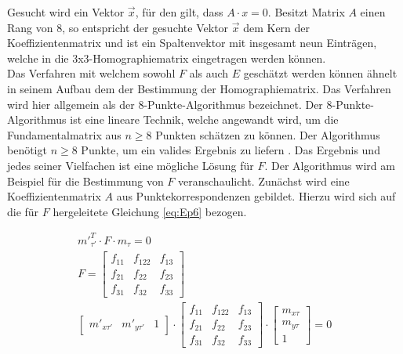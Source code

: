 Gesucht wird ein Vektor $\vec{x}$, für den gilt, dass $A \cdot x = 0$. Besitzt Matrix $A$ einen Rang von 8, so entspricht der gesuchte Vektor $\vec{x}$ dem Kern der Koeffizientenmatrix und ist ein Spaltenvektor mit insgesamt neun Einträgen, welche in die 3x3-Homographiematrix eingetragen werden können\cite{HZ,Schwarz}.\\


Das Verfahren mit welchem sowohl $F$ als auch $E$ geschätzt werden können ähnelt in seinem Aufbau dem der Bestimmung der Homographiematrix. Das Verfahren wird hier allgemein als der 8-Punkte-Algorithmus bezeichnet\cite{HZ,Ferid,Zhang2014}. Der 8-Punkte-Algorithmus ist eine lineare Technik, welche angewandt wird, um die Fundamentalmatrix aus  $n \geq 8$ Punkten schätzen zu können. Der Algorithmus benötigt $n \geq 8$ Punkte, um ein valides Ergebnis zu liefern \cite{HZ,Zhang2014,Ferid}. Das Ergebnis und jedes seiner Vielfachen ist eine mögliche Lösung für $F$. Der Algorithmus wird am Beispiel für die Bestimmung von $F$ veranschaulicht. Zunächst wird eine Koeffizientenmatrix $A$ aus Punktekorrespondenzen gebildet. Hierzu wird sich auf die für $F$ hergeleitete Gleichung \ref{eq:Ep6} bezogen.


\begin{gather*}	
	{m'}_{\tau'}^T \cdot F \cdot m_\tau =0\\
	F=\begin{bmatrix}
		f_{11}&f_{122}&f_{13}\\
		f_{21}&f_{22}&f_{23}\\
		f_{31}&f_{32}&f_{33}
	\end{bmatrix}\\
	\begin{bmatrix}
		m'_{x\tau'}&m'_{y\tau'}&1
	\end{bmatrix} 
	\cdot
	\begin{bmatrix}
		f_{11}&f_{122}&f_{13}\\
		f_{21}&f_{22}&f_{23}\\
		f_{31}&f_{32}&f_{33}
	\end{bmatrix}
	\cdot
	\begin{bmatrix}
		m_{x\tau}\\m_{y\tau}\\1
	\end{bmatrix} =0
\end{gather*}

